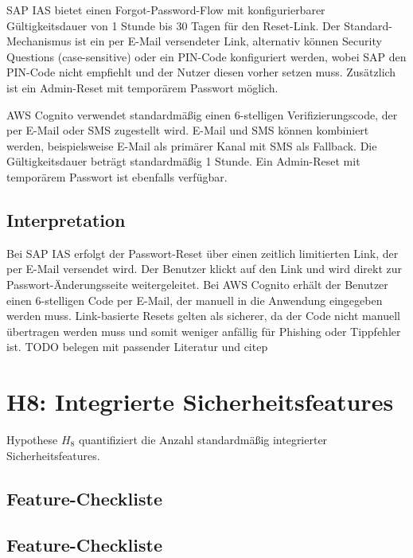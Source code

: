 \ac{SAP IAS} bietet einen Forgot-Password-Flow mit konfigurierbarer Gültigkeitsdauer von 1 Stunde bis 30 Tagen für den Reset-Link. Der Standard-Mechanismus ist ein per E-Mail versendeter Link, alternativ können Security Questions (case-sensitive) oder ein PIN-Code konfiguriert werden, wobei SAP den PIN-Code nicht empfiehlt und der Nutzer diesen vorher setzen muss. Zusätzlich ist ein Admin-Reset mit temporärem Passwort möglich.

\ac{AWS} Cognito verwendet standardmäßig einen 6-stelligen Verifizierungscode, der per E-Mail oder SMS zugestellt wird. E-Mail und SMS können kombiniert werden, beispielsweise E-Mail als primärer Kanal mit SMS als Fallback. Die Gültigkeitsdauer beträgt standardmäßig 1 Stunde. Ein Admin-Reset mit temporärem Passwort ist ebenfalls verfügbar.

\subsection{Interpretation}

Bei \ac{SAP IAS} erfolgt der Passwort-Reset über einen zeitlich limitierten
Link, der per E-Mail versendet wird. Der Benutzer klickt auf den Link und wird
direkt zur Passwort-Änderungsseite weitergeleitet. Bei \ac{AWS} Cognito erhält
der Benutzer einen 6-stelligen Code per E-Mail, der manuell in die Anwendung
eingegeben werden muss. Link-basierte Resets gelten als sicherer, da
der Code nicht manuell übertragen werden muss und somit weniger anfällig für
Phishing oder Tippfehler ist. TODO belegen mit passender Literatur und citep


\section{H8: Integrierte Sicherheitsfeatures}

Hypothese $H_8$ quantifiziert die Anzahl standardmäßig integrierter
Sicherheitsfeatures.

\subsection{Feature-Checkliste}

\subsection{Feature-Checkliste}

